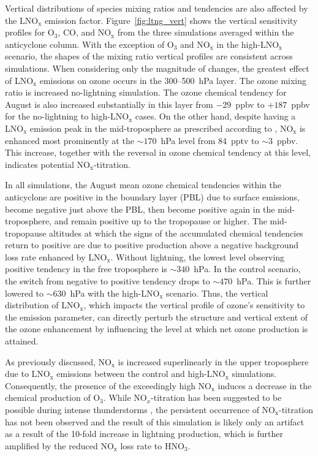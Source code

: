 Vertical distributions of species mixing ratios and tendencies are also affected by
the $\mathrm{LNO_x}$ emission factor. Figure~\ref{fig:ltng_vert} shows the vertical
sensitivity profiles for O$_3$, CO, and NO$_\mathrm{x}$ from the three simulations
averaged within the anticyclone column. With the exception of O$_3$ and
NO$_\mathrm{x}$ in the high-LNO$_{\mathrm{x}}$ scenario, the shapes of the mixing
ratio vertical profiles are consistent across simulations. When considering only
the magnitude of changes, the greatest effect of LNO$_\mathrm{x}$ emissions
on ozone occurs in the 300--500~hPa layer. The ozone mixing ratio is increased
no-lightning simulation. The ozone chemical tendency for August is also increased
substantially in this layer from $-29$~ppbv to $+187$~ppbv for the no-lightning to high-$\mathrm{LNO_x}$ cases.
On the other hand, despite having a LNO$_\mathrm{x}$
emission peak in the mid-troposphere as prescribed according to \citet{Ott:2010lo},
NO$_\mathrm{x}$ is enhanced most prominently at the $\sim170$~hPa level from
84~pptv to $\sim3$~ppbv. This increase, together with the reversal in ozone chemical
tendency at this level, indicates potential NO$_\mathrm{x}$-titration.

In all simulations, the August mean ozone chemical tendencies within the anticyclone
are positive in the boundary layer (PBL) due to surface emissions, become negative just above
the PBL, then become positive again in the mid-troposphere, and remain
positive up to the tropopause or higher. The mid-tropopause altitudes at which the signs of the
accumulated chemical tendencies return to positive are due to positive production above a negative
background loss rate enhanced by LNO$_\mathrm{x}$. Without lightning, the
lowest level observing positive tendency in the free troposphere is $\sim340$~hPa.
In the control scenario, the switch from negative to positive tendency
drops to $\sim470$~hPa. This is further lowered to $\sim630$~hPa with the
high-LNO$_\mathrm{x}$ scenario. Thus, the vertical distribution of LNO$_\mathrm{x}$,
which impacts the vertical profile of ozone's sensitivity to the emission parameter,
can directly perturb the structure and vertical extent of the ozone enhancement
by influencing the level at which net ozone production is attained. %

As previously discussed, NO$_\mathrm{x}$ is increased superlinearly in the upper troposphere due to
LNO$_\mathrm{x}$ emissions between the control and high-$\mathrm{LNO_x}$
simulations. Consequently, the presence of the exceedingly
high NO$_\mathrm{x}$ induces a decrease in the chemical production of
O$_3$. While NO$_x$-titration has been suggested to be possible during intense
thunderstorms \citep[e.g][]{Cummings:2013vn}, the persistent occurrence
of NO$_\mathrm{x}$-titration has not been observed and the result of this simulation is likely only an
artifact as a result of the 10-fold increase in lightning production, which is
further amplified by the reduced NO$_{\mathrm{x}}$ loss rate to HNO$_3$.

